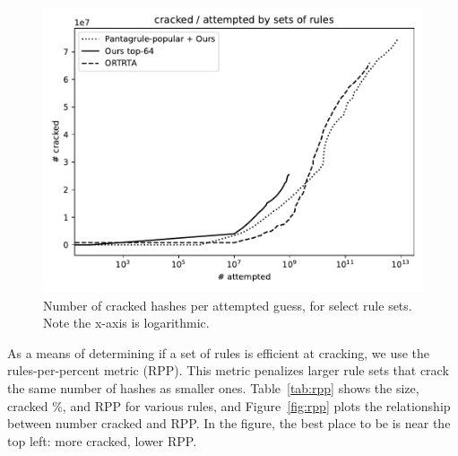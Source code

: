 \documentclass[letterpaper,twocolumn,10pt]{article}
\begin{document}
\begin{figure}[h]
    \includegraphics[width=\linewidth]
    {../cracked_attempted_plot_37b49980-a79a-11ed-8986-005056c00001.pdf}
    \caption{Number of cracked hashes per attempted guess, for select rule
sets. Note the x-axis is logarithmic.}
    \label{fig:cracked-attempted}
\end{figure}

As a means of determining if a set of rules is efficient at cracking, we use
the rules-per-percent metric (RPP). This metric penalizes larger rule sets that
crack the same number of hashes as smaller ones. Table~\ref{tab:rpp} shows the
size, cracked \%, and RPP for various rules, and Figure~\ref{fig:rpp} plots the
relationship between number cracked and RPP. In the figure, the best place to
be is near the top left: more cracked, lower RPP.
\end{document}
